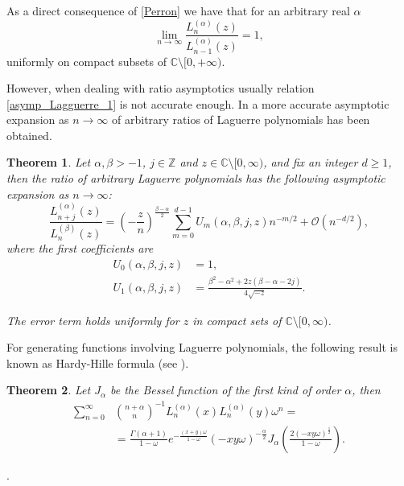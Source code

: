 \documentclass[reqno,10pt]{amsart}
\theoremstyle{plain}
\newtheorem{theorem}{Theorem}[section]
\numberwithin{equation}{section}
\numberwithin{figure}{section}
\begin{document}
As a direct consequence of \eqref{Perron} we have that for an arbitrary real $\alpha$
\begin{equation} \label{asymp_Lagguerre_1}
\lim_{n\to\infty} \frac{L_{n}^{(\alpha)} (z)}{L_{n-1}^{(\alpha)} (z)} = 1,
\end{equation}
uniformly on compact subsets of $\mathbb{C}\setminus [0,+\infty)$.

However, when dealing with ratio asymptotics usually relation \eqref{asymp_Lagguerre_1}
is not accurate enough. In \cite[Theorem 3]{DHM13} a more accurate asymptotic expansion as $n\rightarrow \infty $ of arbitrary ratios of Laguerre polynomials has been obtained.

\begin{theorem}
Let $\alpha,\beta>-1$, $j\in\mathbb{Z}$ and $z\in\mathbb{C}\setminus [0,\infty)$, and fix an integer $d\geq 1$, then the ratio of arbitrary Laguerre polynomials has the following asymptotic expansion as $n\to\infty$:
\begin{equation} \label{asymp_expan}
\frac{L_{n+j}^{(\alpha)}(z)}{L_{n}^{(\beta)}(z)}
=\left(-\frac{z}{n}\right)^{\frac{\beta-\alpha}{2}}\sum_{m=0}^{d-1} U_m(\alpha,\beta,j,z)n^{-m/2}+\mathcal{O}(n^{-d/2}),
\end{equation}
where the first coefficients are
\begin{align*}
U_0(\alpha,\beta,j,z)&=1,\\
U_1(\alpha,\beta,j,z)&=\frac{\beta^2-\alpha^2+2z(\beta-\alpha-2j)}{4\sqrt{-z}}.
\end{align*}

The error term holds uniformly for $z$ in compact sets of $\mathbb{C}\setminus[0,\infty)$.

\end{theorem}


\medskip
 
For generating functions involving Laguerre polynomials, the following  result is known as Hardy-Hille formula 
(see \cite[Theorem 5.1, p. 102]{Szego75}).

\begin{theorem} \label{lema_gen} 
Let $J_{\alpha}$ be the Bessel function of the first kind of order $\alpha$, then
\begin{align}
\sum_{n=0}^{\infty} &\binom{n+\alpha}{n}^{-1}
L^{(\alpha)}_{n}(x) L^{(\alpha)}_{n}(y) \omega^n = \nonumber \\
&= \frac{\Gamma(\alpha+1)}{1-\omega} e^{- \frac{(x+y)\omega}{1-\omega}
} (-xy\omega)^{-\frac{\alpha}{2}} J_{\alpha} \left(  \frac{2(-xy\omega)^{\frac{1}{2}}}{1-\omega}\right). \label{gen_fun_Laguerre}
\end{align}
\end{theorem}.
\end{document}
